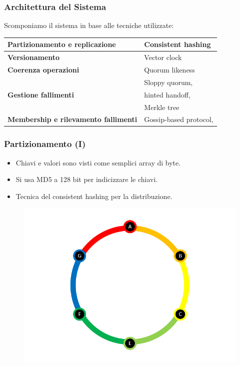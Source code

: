 \begin{frame}
  \frametitle{Architettura del Sistema}
  Scomponiamo il sistema in base alle tecniche utilizzate:
  \begin{table}[ht]
  \begin{center} 
  \begin{tabular}{| l | l |}
  \hline
  \rowcolor{lightgray} 
  \textbf{Partizionamento e replicazione} & Consistent hashing \\
  \hline
  \textbf{Versionamento}                  & Vector clock \\
  \hline
  \rowcolor{lightgray}
  \textbf{Coerenza operazioni}            & Quorum likeness \\
  \hline
  \multirow{3}{*}{\textbf{Gestione fallimenti}}
                                          & Sloppy quorum, \\
                                          & hinted handoff, \\
                                          & Merkle tree \\ 
  \hline
  \rowcolor{lightgray}
  \textbf{Membership e rilevamento fallimenti}  & Gossip-based protocol, \\ 
  \hline
  \end{tabular}
  \end{center}
  \end{table}
\end{frame}


\begin{frame}
  \frametitle{Partizionamento (I)}
  \begin{itemize}
  \item Chiavi e valori sono visti come semplici array di byte.
  \item Si usa MD5 a 128 bit per indicizzare le chiavi.
  \item Tecnica del \alert{consistent hashing} per la distribuzione.
  \end{itemize}
  \begin{figure}
  \centering
  \includegraphics[scale=0.60]{dynamo/consistent-hashing-ring.png}
  \end{figure}
\end{frame}


